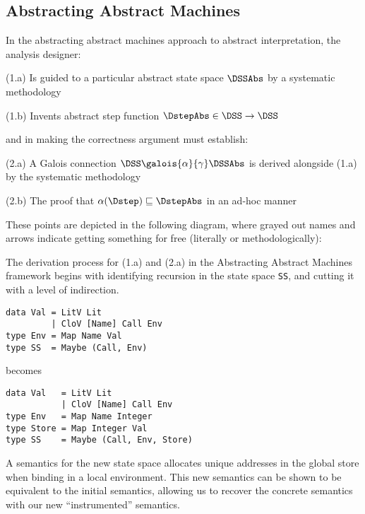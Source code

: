 \subsection{Abstracting Abstract Machines}

In the abstracting abstract machines approach to abstract interpretation, the
analysis designer:
%
\begin{itemizenobreak}
\item (1.a) Is guided to a particular abstract state space $\DSSAbs$ by a systematic methodology
\item (1.b) Invents abstract step function $\DstepAbs \in \DSS \to \DSS$
\end{itemizenobreak}
%
and in making the correctness argument must establish: 
%
\begin{itemizenobreak}
\item (2.a) A Galois connection $\DSS \galois{\alpha}{\gamma} \DSSAbs$ is
      derived alongside (1.a) by the systematic methodology
\item (2.b) The proof that $\alpha(\Dstep) \sqsubseteq \DstepAbs$ in an ad-hoc
      manner
\end{itemizenobreak}
%
These points are depicted in the following diagram, where grayed out names and
arrows indicate getting something for free (literally or methodologically):
%



The derivation process for (1.a) and (2.a) in the Abstracting Abstract Machines
framework begins with identifying recursion in the state space \lstinline|SS|,
and cutting it with a level of indirection.
%
\begin{lstlisting}
data Val = LitV Lit 
         | CloV [Name] Call Env
type Env = Map Name Val                  
type SS  = Maybe (Call, Env)
\end{lstlisting}
%
becomes
%
\begin{lstlisting}
data Val   = LitV Lit
           | CloV [Name] Call Env
type Env   = Map Name Integer
type Store = Map Integer Val
type SS    = Maybe (Call, Env, Store)
\end{lstlisting}
%
A semantics for the new state space allocates unique addresses in the global
store when binding in a local environment.
%
This new semantics can be shown to be equivalent to the initial semantics,
allowing us to recover the concrete semantics with our new ``instrumented''
semantics.



